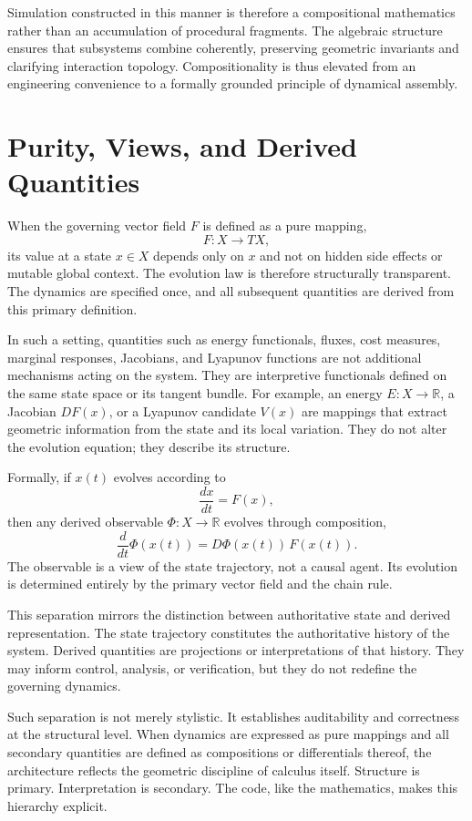 \documentclass[12pt]{book}
\begin{document}
Simulation constructed in this manner is therefore a compositional
mathematics rather than an accumulation of procedural fragments. The
algebraic structure ensures that subsystems combine coherently, preserving
geometric invariants and clarifying interaction topology. Compositionality
is thus elevated from an engineering convenience to a formally grounded
principle of dynamical assembly.

\section{Purity, Views, and Derived Quantities}

When the governing vector field $F$ is defined as a pure mapping,
\[
F : X \to TX,
\]
its value at a state $x \in X$ depends only on $x$ and not on hidden
side effects or mutable global context. The evolution law is therefore
structurally transparent. The dynamics are specified once, and all
subsequent quantities are derived from this primary definition.

In such a setting, quantities such as energy functionals, fluxes,
cost measures, marginal responses, Jacobians, and Lyapunov functions
are not additional mechanisms acting on the system. They are
interpretive functionals defined on the same state space or its tangent
bundle. For example, an energy $E : X \to \mathbb{R}$, a Jacobian
$DF(x)$, or a Lyapunov candidate $V(x)$ are mappings that extract
geometric information from the state and its local variation. They do
not alter the evolution equation; they describe its structure.

Formally, if $x(t)$ evolves according to
\[
\frac{dx}{dt} = F(x),
\]
then any derived observable $\Phi : X \to \mathbb{R}$ evolves through
composition,
\[
\frac{d}{dt} \Phi(x(t))
=
D\Phi(x(t)) \, F(x(t)).
\]
The observable is a view of the state trajectory, not a causal agent.
Its evolution is determined entirely by the primary vector field and
the chain rule.

This separation mirrors the distinction between authoritative state
and derived representation. The state trajectory constitutes the
authoritative history of the system. Derived quantities are projections
or interpretations of that history. They may inform control, analysis,
or verification, but they do not redefine the governing dynamics.

Such separation is not merely stylistic. It establishes auditability
and correctness at the structural level. When dynamics are expressed
as pure mappings and all secondary quantities are defined as
compositions or differentials thereof, the architecture reflects the
geometric discipline of calculus itself. Structure is primary.
Interpretation is secondary. The code, like the mathematics, makes
this hierarchy explicit.
\end{document}
